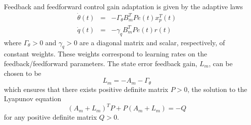 Feedback and feedforward control gain adaptation is given by the adaptive laws
\begin{eqnarray}
	\dot{\theta}(t) &=& - \Gamma_\theta B_m^T P e(t) x_p^T(t) \label{eqn:adaptive_law_theta}\\
	\dot{q}(t) &=& - \gamma_q B_m^T P e(t) r(t)
	\label{eqn:adaptive_law_gamma}
\end{eqnarray}
\noindent where $\Gamma_\theta > 0$ and $\gamma_q > 0$ are a diagonal matrix and scalar, respectively, of constant weights. These weights correspond to learning rates on the feedback/feedforward parameters. The state error feedback gain, $L_m$, can be chosen to be
\begin{equation}
	L_m = - A_m - \Gamma_\theta
	\label{eqn:L_m}
\end{equation}
\noindent which ensures that there exists positive definite matrix $P > 0$, the solution to the Lyapunov equation 
\begin{equation}
(A_m + L_m)^T P + P(A_m + L_m) = - Q
\end{equation}
for any positive definite matrix $Q > 0$. 

